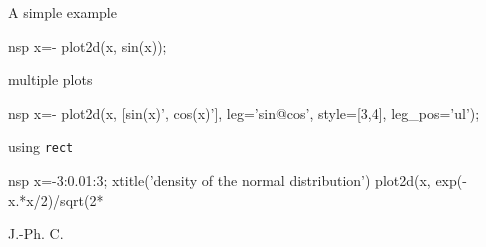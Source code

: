 \begin{examples}

\noindent A simple example

\begin{mintednsp}{nsp}
x=-%
plot2d(x, sin(x));
\end{mintednsp}

\noindent multiple plots

\begin{mintednsp}{nsp}
x=-%
plot2d(x, [sin(x)', cos(x)'], leg='sin@cos', style=[3,4], leg_pos='ul');
\end{mintednsp}

\noindent using \verb!rect!

\begin{mintednsp}{nsp}
x=-3:0.01:3;
xtitle('density of the normal distribution')
plot2d(x, exp(-x.*x/2)/sqrt(2*%
\end{mintednsp}
\end{examples}

\begin{manseealso}
\end{manseealso}
\begin{authors}
  J.-Ph. C.
\end{authors}
